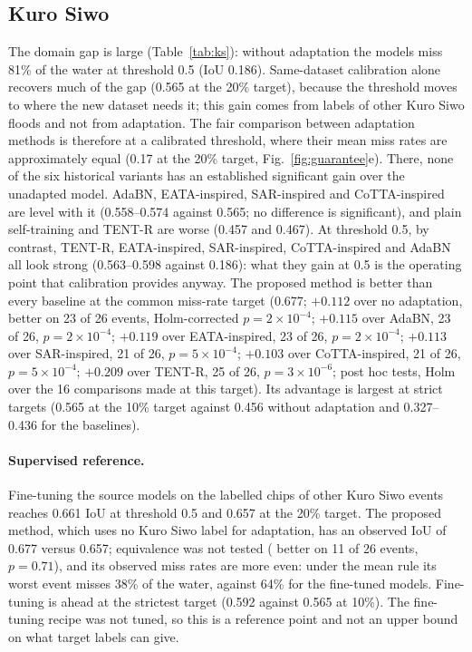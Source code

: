 \documentclass[a4paper,fleqn]{cas-sc}
\begin{document}
\subsection{Kuro Siwo}
The domain gap is large (Table~\ref{tab:ks}): without adaptation the models miss 81\% of the water at threshold 0.5 (IoU 0.186). Same-dataset calibration alone recovers much of the gap (0.565 at the 20\% target), because the threshold moves to where the new dataset needs it; this gain comes from labels of other Kuro Siwo floods and not from adaptation. The fair comparison between adaptation methods is therefore at a calibrated threshold, where their mean miss rates are approximately equal (0.17 at the 20\% target, Fig.~\ref{fig:guarantee}e). There, none of the six historical variants has an established significant gain over the unadapted model. AdaBN, EATA-inspired, SAR-inspired and CoTTA-inspired are level with it (0.558--0.574 against 0.565; no difference is significant), and plain self-training and TENT-R are worse (0.457 and 0.467). At threshold 0.5, by contrast, TENT-R, EATA-inspired, SAR-inspired, CoTTA-inspired and AdaBN all look strong (0.563--0.598 against 0.186): what they gain at 0.5 is the operating point that calibration provides anyway. The proposed method is better than every baseline at the common miss-rate target (0.677; $+0.112$ over no adaptation, better on 23 of 26 events, Holm-corrected $p=2\times10^{-4}$; $+0.115$ over AdaBN, 23 of 26, $p=2\times10^{-4}$; $+0.119$ over EATA-inspired, 23 of 26, $p=2\times10^{-4}$; $+0.113$ over SAR-inspired, 21 of 26, $p=5\times10^{-4}$; $+0.103$ over CoTTA-inspired, 21 of 26, $p=5\times10^{-4}$; $+0.209$ over TENT-R, 25 of 26, $p=3\times10^{-6}$; post hoc tests, Holm over the 16 comparisons made at this target). Its advantage is largest at strict targets (0.565 at the 10\% target against 0.456 without adaptation and 0.327--0.436 for the baselines).

\paragraph{Supervised reference.} Fine-tuning the source models on the labelled chips of other Kuro Siwo events reaches 0.661 IoU at threshold 0.5 and 0.657 at the 20\% target. The proposed method, which uses no Kuro Siwo label for adaptation, has an observed IoU of 0.677 versus 0.657; equivalence was not tested ( better on 11 of 26 events, $p=0.71$), and its observed miss rates are more even: under the mean rule its worst event misses 38\% of the water, against 64\% for the fine-tuned models. Fine-tuning is ahead at the strictest target (0.592 against 0.565 at 10\%). The fine-tuning recipe was not tuned, so this is a reference point and not an upper bound on what target labels can give.
\end{document}
